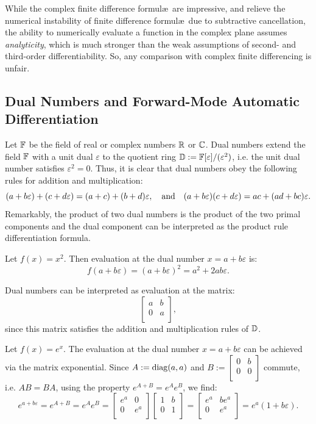 While the complex finite difference formul\ae~are impressive, and relieve the numerical instability of finite difference formul\ae~due to subtractive cancellation, the ability to numerically evaluate a function in the complex plane assumes {\em analyticity}, which is much stronger than the weak assumptions of second- and third-order differentiability. So, any comparison with complex finite differencing is unfair.

\subsection{Dual Numbers and Forward-Mode Automatic Differentiation}

Let $\mathbb{F}$ be the field of real or complex numbers $\mathbb{R}$ or $\mathbb{C}$. Dual numbers extend the field $\mathbb{F}$ with a unit dual $\varepsilon$ to the quotient ring $\mathbb{D}:= \mathbb{F}[\varepsilon]/(\varepsilon^2)$, i.e. the unit dual number satisfies $\varepsilon^2=0$. Thus, it is clear that dual numbers obey the following rules for addition and multiplication:
\[
(a+b\varepsilon) + (c+d\varepsilon) = (a+c) + (b+d)\varepsilon,\quad{\rm and}\quad (a+b\varepsilon)(c+d\varepsilon) = ac + (ad+bc)\varepsilon.
\]
Remarkably, the product of two dual numbers is the product of the two primal components and the dual component can be interpreted as the product rule differentiation formula.
\begin{example}
Let $f(x) = x^2$. Then evaluation at the dual number $x=a+b\varepsilon$ is:
\[
f(a+b\varepsilon) = (a+b\varepsilon)^2 = a^2 + 2ab\varepsilon.
\]
\end{example}
Dual numbers can be interpreted as evaluation at the matrix:
\[
\begin{bmatrix}
a & b\\
0 & a\\
\end{bmatrix},
\]
since this matrix satisfies the addition and multiplication rules of $\mathbb{D}$.
\begin{example}
Let $f(x) = e^x$. The evaluation at the dual number $x=a+b\varepsilon$ can be achieved via the matrix exponential. Since $A:=\operatorname{diag}(a,a)$ and $B:=\begin{bmatrix} 0 & b\\0 & 0\\\end{bmatrix}$ commute, i.e. $AB=BA$, using the property $e^{A+B} = e^Ae^B$, we find:
\[
e^{a+b\varepsilon} = e^{A+B} = e^Ae^B = \begin{bmatrix}e^a & 0\\ 0 & e^a\\\end{bmatrix}\begin{bmatrix}1 & b\\ 0 & 1\\\end{bmatrix} = \begin{bmatrix}e^a & be^a\\ 0 & e^a\\\end{bmatrix} = e^a(1+b\varepsilon).
\]
\end{example}

